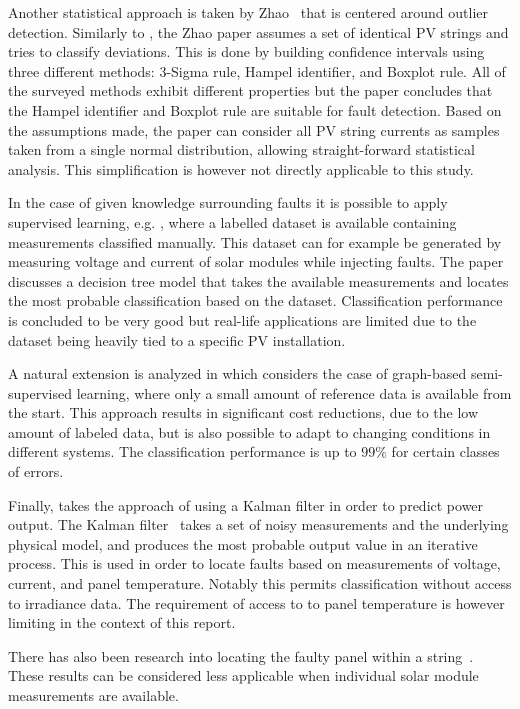 Another statistical approach is taken by Zhao~\cite{Zhao2013outlier} that is centered around outlier detection.
Similarly to \cite{Vergura2008,Vergura2009}, the Zhao paper assumes a set of identical PV strings and tries to classify deviations.
This is done by building confidence intervals using three different methods: 3-Sigma rule, Hampel identifier, and Boxplot rule.
All of the surveyed methods exhibit different properties but the paper concludes that the Hampel identifier and Boxplot rule are suitable for fault detection.
Based on the assumptions made, the paper can consider all PV string currents as samples taken from a single normal distribution, allowing straight-forward statistical analysis.
This simplification is however not directly applicable to this study.

In the case of given knowledge surrounding faults it is possible to apply supervised learning, e.g. \cite{Zhao2012tree},
where a labelled dataset is available containing measurements classified manually.
This dataset can for example be generated by measuring voltage and current of solar modules while injecting faults.
The paper discusses a decision tree model that takes the available measurements and locates the most probable classification based on the dataset.
Classification performance is concluded to be very good but real-life applications are limited due to the dataset being heavily tied to a specific PV installation.

A natural extension is analyzed in \cite{Zhao2013graph} which considers the case of graph-based semi-supervised learning, where only a small amount of reference data is available from the start.
This approach results in significant cost reductions, due to the low amount of labeled data, but is also possible to adapt to changing conditions in different systems.
The classification performance is up to $99\%$ for certain classes of errors.

Finally, \cite{Kang2012} takes the approach of using a Kalman filter in order to predict power output.
The Kalman filter~\cite{Kang2012} takes a set of noisy measurements and the underlying physical model, and produces the most probable output value in an iterative process.
This is used in order to locate faults based on measurements of voltage, current, and panel temperature.
Notably this permits classification without access to irradiance data.
The requirement of access to to panel temperature is however limiting in the context of this report.

There has also been research into locating the faulty panel within a string~\cite{Lin2012}.
These results can be considered less applicable when individual solar module measurements are available.

